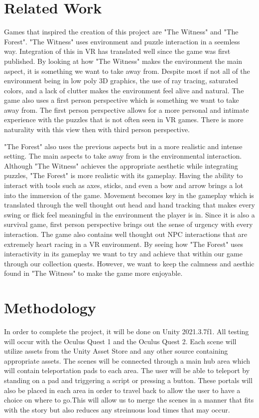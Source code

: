 \documentclass{vgtc}                          %
\begin{document}
\section{Related Work}
Games that inspired the creation of this project are "The Witness" and "The Forest". "The Witness" uses environment and puzzle interaction in a seemless way. Integration of this in VR has translated well
since the game was first published. By looking at how "The Witness" makes the environment the main aspect, it is something we want to take away from. Despite most if not all of the environment being in low poly 3D graphics, the 
use of ray tracing, saturated colors, and a lack of clutter makes the environment feel alive and natural. The game also uses a first person perspective which is something we want to take away from. The first person perspective allows for a more 
personal and intimate experience with the puzzles that is not often seen in VR games. There is more naturality with this view then with third person perspective.

"The Forest" also uses the previous aspects but in a more realistic and intense setting. The main aspects to take away from is the environmental interaction. Although "The Witness" achieves the appropriate aesthetic while integrating puzzles, "The Forest"
is more realistic with its gameplay. Having the ability to interact with tools such as axes, sticks, and even a bow and arrow brings a lot into the immersion of the game. Movement becomes key in the gameplay which is translated through the well thought out head and hand tracking
that makes every swing or flick feel meaningful in the environment the player is in. Since it is also a survival game, first person perspective brings out the sense of urgency
with every interaction. The game also contains well thought out NPC interactions that are extremely heart racing in a VR environment. By seeing how "The Forest" uses interactivity in its gameplay we want to try and achieve that within our game through our collection
quests. However, we want to keep the calmness and aesthic found in "The Witness" to make the game more enjoyable.

\section{Methodology}
In order to complete the project, it will be done on Unity 2021.3.7f1. All testing will occur with the Oculus Quest 1 and the Oculus Quest 2. Each scene will utilize assets from the Unity Asset Store and any other
source containing appropriate assets. The scenes will be connected through a main hub area which will contain teleportation pads to each area. The user will be able to teleport by standing on a pad and triggering
a script or pressing a button. These portals will also be placed in each area
in order to travel back to allow the user to have a choice on where to go.This will allow us to merge the scenes in a manner that fits with the story but also reduces any streinuous load times that may
occur.
\end{document}
